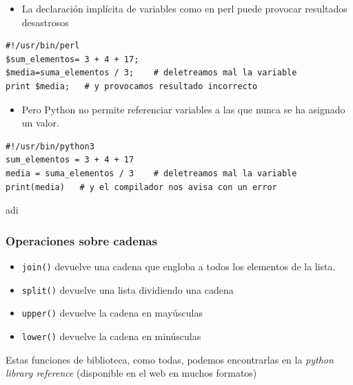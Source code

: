 \documentclass{beamer}
\begin{document}
\begin{frame}[fragile]

\begin{itemize}
  
\item 
La declaración implícita de variables como en perl puede provocar resultados desastrosos
\end{itemize}

\begin{footnotesize}
\begin{verbatim}
#!/usr/bin/perl
$sum_elementos= 3 + 4 + 17;
$media=suma_elementos / 3;    # deletreamos mal la variable
print $media;   # y provocamos resultado incorrecto
\end{verbatim}
\end{footnotesize}

\begin{itemize}
\item 
Pero Python no permite referenciar variables a las que nunca se ha
asignado un valor.
\end{itemize}
\begin{footnotesize}
\begin{verbatim}
#!/usr/bin/python3
sum_elementos = 3 + 4 + 17
media = suma_elementos / 3    # deletreamos mal la variable
print(media)   # y el compilador nos avisa con un error
\end{verbatim}
\end{footnotesize}
adi

\end{frame}


\begin{frame}[fragile]
\frametitle{Operaciones sobre cadenas}

\begin{itemize}
\item \verb|join()| devuelve una cadena que engloba a todos los elementos de la lista.\\
\item \verb|split()| devuelve una lista dividiendo una cadena\\
\item \verb|upper()| devuelve la cadena en mayúsculas\\
\item \verb|lower()| devuelve la cadena en minúsculas\\
\end{itemize}

Estas funciones de biblioteca, como todas, podemos encontrarlas
en la \emph{python library reference}
(disponible en el web en muchos formatos)

\end{frame}
\end{document}
